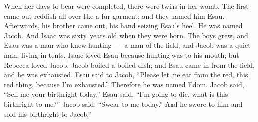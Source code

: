 \begin{inparaenum}
     When her days to bear were completed, there were twins in her womb.%
     The first came out reddish all over like a fur garment; and they named him Esau.%
     Afterwards, his brother came out, his hand seizing Esau's heel. He was named Jacob. And Isaac was sixty~years old when they were born.%
     The boys grew, and Esau was a man who knew hunting~--- a man of the field; and Jacob was a quiet man, living in tents.%
     Isaac loved Esau because hunting was to his mouth; but Rebecca loved Jacob.%
     Jacob boiled a boiled dish; and Esau came in from the field, and he was exhausted.%
     Esau said to Jacob, ``Please let me eat from the red, this red thing, because I'm exhausted.'' Therefore he was named Edom.%
     Jacob said, ``Sell me your birthright today.''%
     Esau said, ``I'm going to die, what is this birthright to me?''%
     Jacob said, ``Swear to me today.'' And he swore to him and sold his birthright to Jacob.''%
\end{inparaenum}
